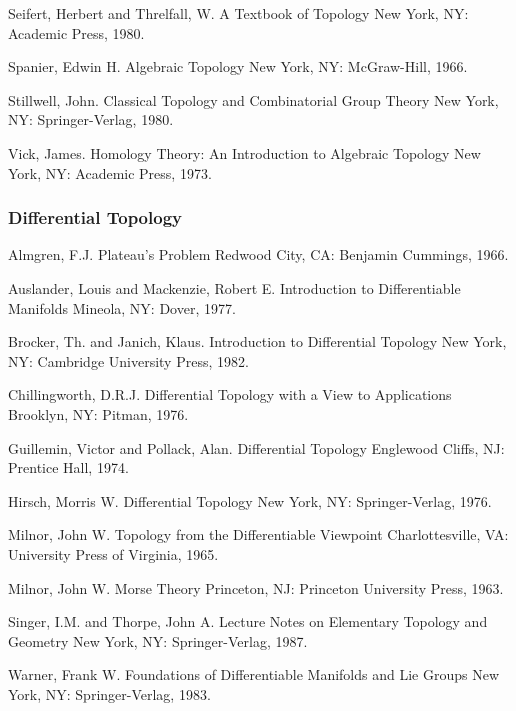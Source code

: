 \documentclass[12pt]{article}
\theoremstyle{plain}
\theoremstyle{definition}
\numberwithin{equation}{section}
\begin{document}
Seifert, Herbert and Threlfall, W. A Textbook of Topology New York, NY: Academic Press, 1980. 

Spanier, Edwin H. Algebraic Topology New York, NY: McGraw-Hill, 1966. 

Stillwell, John. Classical Topology and Combinatorial Group Theory New York, NY: Springer-Verlag, 1980. 

Vick, James. Homology Theory: An Introduction to Algebraic Topology New York, NY: Academic Press, 1973. 

\subsubsection{Differential Topology}

Almgren, F.J. Plateau's Problem Redwood City, CA: Benjamin Cummings, 1966. 

Auslander, Louis and Mackenzie, Robert E. Introduction to Differentiable Manifolds Mineola, NY: Dover, 1977. 

Brocker, Th. and Janich, Klaus. Introduction to Differential Topology New York, NY: Cambridge University Press, 1982. 

Chillingworth, D.R.J. Differential Topology with a View to Applications Brooklyn, NY: Pitman, 1976. 

Guillemin, Victor and Pollack, Alan. Differential Topology Englewood Cliffs, NJ: Prentice Hall, 1974. 

Hirsch, Morris W. Differential Topology New York, NY: Springer-Verlag, 1976. 

Milnor, John W. Topology from the Differentiable Viewpoint Charlottesville, VA: University Press of Virginia, 1965. 

Milnor, John W. Morse Theory Princeton, NJ: Princeton University Press, 1963. 

Singer, I.M. and Thorpe, John A. Lecture Notes on Elementary Topology and Geometry New York, NY: Springer-Verlag, 1987. 

Warner, Frank W. Foundations of Differentiable Manifolds and Lie Groups New York, NY: Springer-Verlag, 1983. 


\end{document}
